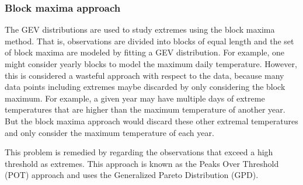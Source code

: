 \documentclass[letter,12pt]{article}
\begin{document}
\subsubsection{Block maxima approach}
The GEV distributions are used to study extremes using the block maxima method. That is, observations are divided into blocks of equal length and the set of block maxima are modeled by fitting a GEV distribution. For example, one might consider yearly blocks to model the maximum daily temperature. However, this is considered a wasteful approach with respect to the data, because many data points including extremes maybe discarded by only considering the block maximum. For example, a given year may  have multiple days of extreme temperatures that are higher than the maximum temperature of another year. But the block maxima approach would discard these other extremal temperatures and only consider the maximum temperature of each year.

This problem is remedied by regarding the observations that exceed a high threshold as extremes. This approach is known as the Peaks Over Threshold (POT) approach and uses the Generalized Pareto Distribution (GPD).  
\end{document}
